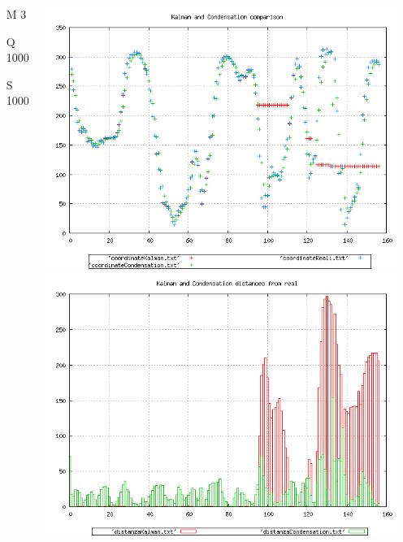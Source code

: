 \documentclass{beamer}
\begin{document}
{\begin{columns}
\begin{scriptsize}
\begin{itemize}
\item [M]3
\item [Q]1000
\item [S]1000
\end{itemize}
\end{scriptsize}
\includegraphics[scale=0.1]{../esperimenti/tappeto_nozoom/mod_3-Q_1000-S_1000/plot.png}\\
\includegraphics[scale=0.1]{../esperimenti/tappeto_nozoom/mod_3-Q_1000-S_1000/plot-distances.png}


\end{columns}}
\end{document}
